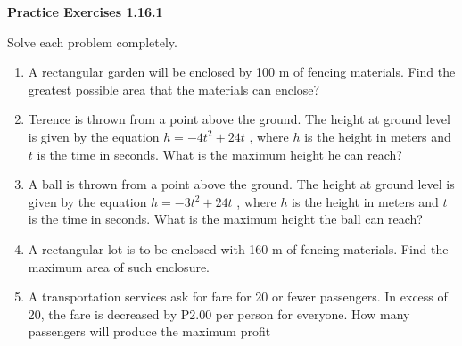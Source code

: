 \noindent\textbf{Practice Exercises 1.16.1}


Solve each problem completely. 
\begin{enumerate}[label = \color{blue}\arabic*. ]
\item A rectangular garden will be enclosed by 100 m of fencing materials. Find the greatest possible area that the materials can enclose?
\item Terence is thrown from a point above the ground. The height at ground level is 
given by the equation $h = -4t^{2} + 24t$ , where $h$ is the height in meters and $t$ is the time in seconds. What is the maximum height he can reach?
\item A ball is thrown from a point above the ground. The height at ground level is 
given by the equation $h = -3t^{2} + 24t$ , where $h$ is the height in meters and $t$ is the time in seconds. What is the maximum height the ball can reach?
\item A rectangular lot is to be enclosed with 160 m of fencing materials. Find the maximum area of such enclosure.
\item A transportation services ask for  fare for 20 or fewer passengers. In excess of 20, the fare is decreased by P2.00 per person for everyone. How many passengers will produce the maximum profit 
\end{enumerate}
